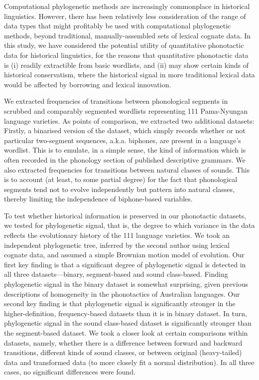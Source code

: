 Computational phylogenetic methods are increasingly commonplace in historical linguistics. However, there has been relatively less consideration of the range of data types that might profitably be used with computational phylogenetic methods, beyond traditional, manually-assembled sets of lexical cognate data. In this study, we have considered the potential utility of quantitative phonotactic data for historical linguistics, for the reasons that quantitative phonotactic data is (i) readily extractible from basic wordlists, and (ii) may show certain kinds of historical conservatism, where the historical signal in more traditional lexical data would be affected by borrowing and lexical innovation.

We extracted frequencies of transitions between phonological segments in scrubbed and comparably segmented wordlists representing 111 Pama-Nyungan language varieties. As points of comparison, we extracted two additional datasets: Firstly, a binarised version of the dataset, which simply records whether or not particular two-segment sequences, a.k.a. biphones, are present in a language's wordlist. This is to emulate, in a simple sense, the kind of information which is often recorded in the phonology section of published descriptive grammars. We also extracted frequencies for transitions between natural classes of sounds. This is to account (at least, to some partial degree) for the fact that phonological segments tend not to evolve independently but pattern into natural classes, thereby limiting the independence of biphone-based variables.

To test whether historical information is preserved in our phonotactic datasets, we tested for phylogenetic signal, that is, the degree to which variance in the data reflects the evolutionary history of the 111 language varieties. We took an independent phylogenetic tree, inferred by the second author using lexical cognate data, and assumed a simple Brownian motion model of evolution. Our first key finding is that a significant degree of phylogenetic signal is detected in all three datasets---binary, segment-based and sound class-based. Finding phylogenetic signal in the binary dataset is somewhat surprising, given previous descriptions of homogeneity in the phonotactics of Australian languages. Our second key finding is that phylogenetic signal is significantly stronger in the higher-definition, frequency-based datasets than it is in binary dataset. In turn, phylogenetic signal in the sound class-based dataset is significantly stronger than the segment-based dataset. We took a closer look at certain comparisons within datasets, namely, whether there is a difference between forward and backward transitions, different kinds of sound classes, or between original (heavy-tailed) data and transformed data (to more closely fit a normal distribution). In all three cases, no significant differences were found.

